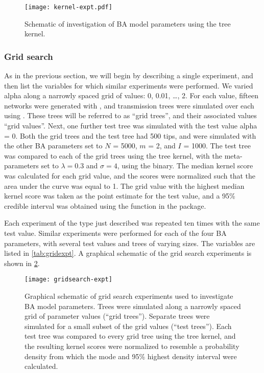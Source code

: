 \begin{figure}[ht]
  \centering
  \texttt{[image: kernel-expt.pdf]}
  \caption[Schematic of kernel classifier experiment]{
    Schematic of investigation of \gls{BA} model parameters using the tree
    kernel.
  }
  \label{fig:kernelexpt}
\end{figure}

\subsubsection*{Grid search}

As in the previous section, we will begin by describing a single experiment,
and then list the variables for which similar experiments were performed. We
varied \gls{alpha} along a narrowly spaced grid of values: 0, 0.01, \ldots, 2.
For each value, fifteen networks were generated with , and
transmission trees were simulated over each using . These
trees will be referred to as ``grid trees'', and their associated values ``grid
values''. Next, one further test tree was simulated with the test value
\gls{alpha} = 0. Both the grid trees and the test tree had 500 tips, and were
simulated with the other \gls{BA} parameters set to $N$ = 5000, $m$ = 2, and
$I$ = 1000. The test tree was compared to each of the grid trees using the tree
kernel, with the meta-parameters set to $\lambda = 0.3$ and $\sigma = 4$, using
the  binary. The median kernel score was calculated for
each grid value, and the scores were normalized such that the area under the
curve was equal to 1. The grid value with the highest median kernel score was
taken as the point estimate for the test value, and a 95\% credible interval
was obtained using the  function in the 
package.

Each experiment of the type just described was repeated ten times with the same
test value. Similar experiments were performed for each of the four \gls{BA}
parameters, with several test values and trees of varying sizes. The variables
are listed in \cref{tab:gridexpt}. A graphical schematic of the grid search
experiments is shown in \cref{fig:gridexpt}.

\begin{figure}[ht]
  \centering
  \texttt{[image: gridsearch-expt]}
  \caption{
    Graphical schematic of grid search experiments used to investigate \gls{BA}
    model parameters. Trees were simulated along a narrowly spaced grid of
    parameter values (``grid trees''). Separate trees were simulated for a
    small subset of the grid values (``test trees''). Each test tree was
    compared to every grid tree using the tree kernel, and the resulting kernel
    scores were normalized to resemble a probability density from which the
    mode and 95\% highest density interval were calculated.
  }
  \label{fig:gridexpt}
\end{figure}


